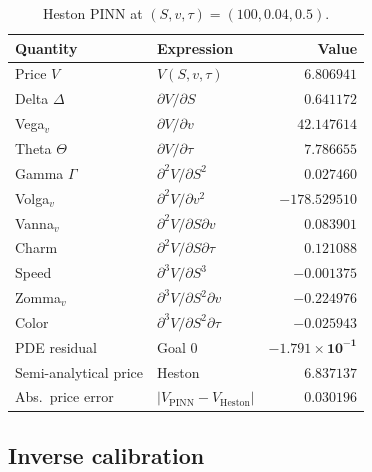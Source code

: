 \begin{table}[htbp!]
    \centering
    \footnotesize
    \setlength{\tabcolsep}{4pt}
    \renewcommand{\arraystretch}{1.1}
    \caption{Heston PINN at $(S,v,\tau)=(100,0.04,0.5)$.}
    \label{tab:heston_pinn_greeks}
    \begin{tabularx}{\linewidth}{@{} l X r @{}}
        \toprule
        \textbf{Quantity} & \textbf{Expression} & \textbf{Value} \\
        \midrule
        Price $V$           & $V(S,v,\tau)$                          & $6.806941$ \\
        Delta $\Delta$      & $\partial V/\partial S$                & $0.641172$ \\
        Vega$_v$            & $\partial V/\partial v$                & $42.147614$ \\
        Theta $\Theta$      & $\partial V/\partial\tau$              & $7.786655$ \\
        Gamma $\Gamma$      & $\partial^2 V/\partial S^2$            & $0.027460$ \\
        Volga$_v$           & $\partial^2 V/\partial v^2$            & $-178.529510$ \\
        Vanna$_v$           & $\partial^2 V/\partial S\partial v$    & $0.083901$ \\
        Charm               & $\partial^2 V/\partial S\partial\tau$  & $0.121088$ \\
        Speed               & $\partial^3 V/\partial S^3$            & $-0.001375$ \\
        Zomma$_v$           & $\partial^3 V/\partial S^2\partial v$  & $-0.224976$ \\
        Color               & $\partial^3 V/\partial S^2\partial\tau$ & $-0.025943$ \\
        \midrule
        PDE residual        & Goal $0$                                & $\mathbf{-1.791\!\times\!10^{-1}}$ \\
        Semi-analytical price & Heston                                & $\mathbf{6.837137}$ \\
        Abs.\ price error   & $|V_{\mathrm{PINN}}-V_{\mathrm{Heston}}|$ & $\mathbf{0.030196}$ \\
        \bottomrule
    \end{tabularx}
\end{table}

\subsection{Inverse calibration}\label{subsec:results-inv}

